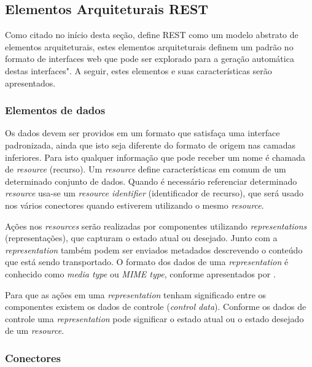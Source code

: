 
\subsection{Elementos Arquiteturais REST}

Como citado no início desta seção,  define REST como um modelo abstrato de elementos arquiteturais, estes elementos arquiteturais definem um padrão no formato de interfaces web que pode ser explorado para a geração automática destas interfaces". A seguir, estes elementos e suas características serão apresentados.


\subsubsection{Elementos de dados}
Os dados devem ser providos em um formato que satisfaça uma interface padronizada, ainda que isto seja diferente do formato de origem nas camadas inferiores. Para isto qualquer informação que pode receber um nome é chamada de \textit{resource} (recurso). Um \textit{resource} define características em comum de um determinado conjunto de dados. Quando é necessário referenciar determinado \textit{resource} usa-se um \textit{resource identifier} (identificador de recurso), que será usado nos vários conectores quando estiverem utilizando o mesmo \textit{resource}.

Ações nos \textit{resources} serão realizadas por componentes utilizando \textit{representations} (representações), que capturam o estado atual ou desejado. Junto com a \textit{representation} também podem ser enviados metadados descrevendo o conteúdo que está sendo transportado. O formato dos dados de uma \textit{representation} é conhecido como \textit{media type} ou \textit{MIME type}, conforme apresentados por .

Para que as ações em uma \textit{representation} tenham significado entre os componentes existem os dados de controle (\textit{control data}). Conforme os dados de controle uma \textit{representation} pode significar o estado atual ou o estado desejado de um \textit{resource}.


\subsubsection{Conectores}		

